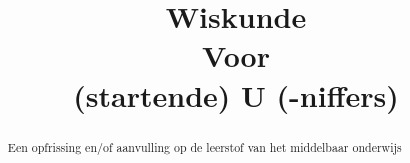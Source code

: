 \documentclass[numbers]{xourse}
\title{Wiskunde\\ Voor \\{\small(startende) } U { \small(-niffers)}}
\begin{document}
\begin{abstract}
	Een opfrissing en/of aanvulling op de leerstof van het middelbaar onderwijs
\end{abstract}
\maketitle



\end{document}
